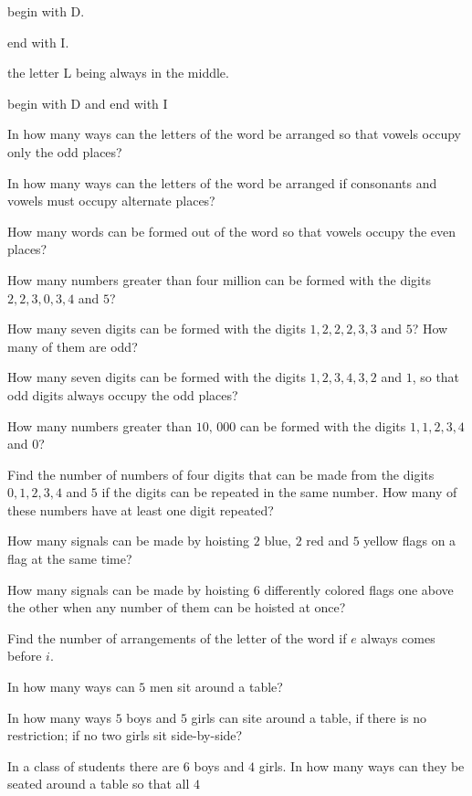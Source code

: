  \startitemize[i]
  \item begin with D.
  \item end with I.
  \item the letter L being always in the middle.
  \item begin with D and end with I
  \stopitemize
\item In how many ways can the letters of the word  be arranged so that vowels occupy only the odd places?
\item In how many ways can the letters of the word  be arranged if consonants and vowels must occupy alternate places?
\item How many words can be formed out of the word  so that vowels occupy the even places?
\item How many numbers greater than four million can be formed with the digits $2, 2, 3, 0, 3, 4$ and $5$?
\item How many seven digits can be formed with the digits $1, 2, 2, 2, 3, 3$ and $5$? How many of them are odd?
\item How many seven digits can be formed with the digits $1, 2, 3, 4, 3, 2$ and $1$, so that odd digits always occupy the odd
  places?
\item How many numbers greater than $10,\,000$ can be formed with the digits $1, 1, 2, 3, 4$ and $0$?
\item Find the number of numbers of four digits that can be made from the digits $0, 1, 2, 3, 4$ and $5$ if the digits can be
  repeated in the same number. How many of these numbers have at least one digit repeated?
\item How many signals can be made by hoisting $2$ blue, $2$ red and $5$ yellow flags on a flag at the same time?
\item How many signals can be made by hoisting $6$ differently colored flags one above the other when any number of them can be
  hoisted at once?
\item Find the number of arrangements of the letter of the word  if $e$ always comes before $i$.
\item In how many ways can $5$ men sit around a table?
\item In how many ways $5$ boys and $5$ girls can site around a table, if there is no restriction; if no two girls sit
  side-by-side?
\item In a class of students there are $6$ boys and $4$ girls. In how many ways can they be seated around a table so that all $4$
